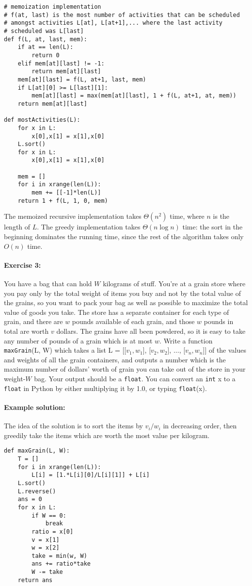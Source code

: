 \documentclass[11pt]{article}
\begin{document}
\begin{verbatim}
# memoization implementation
# f(at, last) is the most number of activities that can be scheduled
# amongst activities L[at], L[at+1],... where the last activity
# scheduled was L[last] 
def f(L, at, last, mem):
    if at == len(L):
        return 0
    elif mem[at][last] != -1:
        return mem[at][last]
    mem[at][last] = f(L, at+1, last, mem)
    if L[at][0] >= L[last][1]:
        mem[at][last] = max(mem[at][last], 1 + f(L, at+1, at, mem))
    return mem[at][last]

def mostActivities(L):
    for x in L:
        x[0],x[1] = x[1],x[0]
    L.sort()
    for x in L:
        x[0],x[1] = x[1],x[0]

    mem = []
    for i in xrange(len(L)):
        mem += [[-1]*len(L)]
    return 1 + f(L, 1, 0, mem)
\end{verbatim}

The memoized recursive implementation takes $\Theta(n^2)$ time, where
$n$ is the length of $L$.  The greedy implementation takes
$\Theta(n\log n)$ time: the sort in the beginning dominates the
running time, since the rest of the algorithm takes only $O(n)$ time.

\paragraph{Exercise 3:}
You have a bag that can hold $W$ kilograms of stuff.  You're at a
grain store where you pay only by the total weight of items you buy
and not
by the total value of the grains, so you want to pack your bag as well
as possible
to maximize the total value of goods you take.  The store has a
separate container for each type of grain, and there are $w$ pounds
available of each grain, and those $w$ pounds in total are worth $v$
dollars.  The grains have all been powdered, so it is easy to take any
number of pounds of a grain which is at most $w$.  Write a function
\texttt{maxGrain}(L, W) which takes a list L = [[$v_1,w_1$], [$v_2,w_2$],
$\ldots$, [$v_n,w_n$]] of the values and weights of all the grain
containers, and outputs a number which is the maximum number of
dollars' worth of grain you can take out of the store in your
weight-$W$ bag.  Your output should be a \texttt{float}.  You can
convert an \texttt{int} x to a \texttt{float} in Python by either
multiplying it by 1.0, or typing \texttt{float}(x).

\paragraph{Example solution:}
The idea of the solution is to sort the items by $v_i/w_i$ in
decreasing order, then greedily take the items which are worth the
most value per kilogram.

\begin{verbatim}
def maxGrain(L, W):
    T = []
    for i in xrange(len(L)):
        L[i] = [1.*L[i][0]/L[i][1]] + L[i]
    L.sort()
    L.reverse()
    ans = 0
    for x in L:
        if W == 0:
            break
        ratio = x[0]
        v = x[1]
        w = x[2]
        take = min(w, W)
        ans += ratio*take
        W -= take
    return ans
\end{verbatim}
\end{document}
